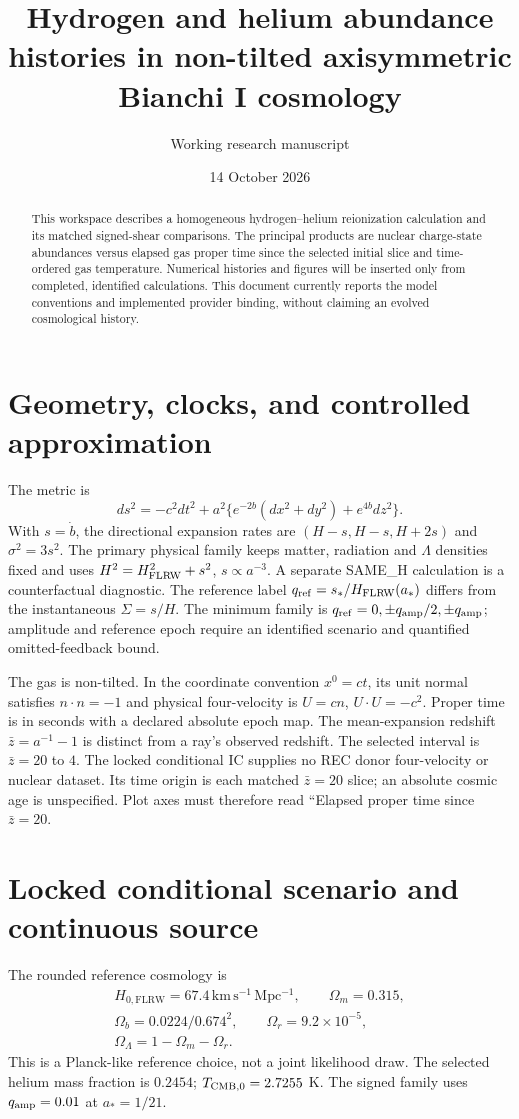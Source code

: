 \documentclass[11pt]{article}
\title{Hydrogen and helium abundance histories in non-tilted axisymmetric Bianchi I cosmology}
\author{Working research manuscript}
\date{14 October 2026}
\begin{document}
\maketitle
\begin{abstract}
This workspace describes a homogeneous hydrogen--helium reionization calculation and its matched signed-shear comparisons. The principal products are nuclear charge-state abundances versus elapsed gas proper time since the selected initial slice and time-ordered gas temperature. Numerical histories and figures will be inserted only from completed, identified calculations. This document currently reports the model conventions and implemented provider binding, without claiming an evolved cosmological history.
\end{abstract}
\section{Geometry, clocks, and controlled approximation}
The metric is
\begin{equation}
 ds^2=-c^2dt^2+a^2\{e^{-2b}(dx^2+dy^2)+e^{4b}dz^2\}.
\end{equation}
With $s=\dot b$, the directional expansion rates are $(H-s,H-s,H+2s)$ and $\sigma^2=3s^2$. The primary physical family keeps matter, radiation and $\Lambda$ densities fixed and uses $H^2=H_{\rm FLRW}^2+s^2$, $s\propto a^{-3}$. A separate SAME\_H calculation is a counterfactual diagnostic. The reference label $q_{\rm ref}=s_*/H_{\rm FLRW}(a_*)$ differs from the instantaneous $\Sigma=s/H$. The minimum family is $q_{\rm ref}=0,\pm q_{\rm amp}/2,\pm q_{\rm amp}$; amplitude and reference epoch require an identified scenario and quantified omitted-feedback bound.

The gas is non-tilted. In the coordinate convention $x^0=ct$, its unit normal satisfies $n\cdot n=-1$ and physical four-velocity is $U=cn$, $U\cdot U=-c^2$. Proper time is in seconds with a declared absolute epoch map. The mean-expansion redshift $\bar z=a^{-1}-1$ is distinct from a ray's observed redshift. The selected interval is $\bar z=20$ to $4$. The locked conditional IC supplies no REC donor four-velocity or nuclear dataset. Its time origin is each matched $\bar z=20$ slice; an absolute cosmic age is unspecified. Plot axes must therefore read ``Elapsed proper time since $\bar z=20$.


\section{Locked conditional scenario and continuous source}
The rounded reference cosmology is
\begin{gather*}
H_{0,\mathrm{FLRW}}=67.4\,\mathrm{km\,s^{-1}\,Mpc^{-1}},\qquad \Omega_m=0.315,\\
\Omega_b=0.0224/0.674^2,\qquad \Omega_r=9.2\times10^{-5},\\
\Omega_\Lambda=1-\Omega_m-\Omega_r.
\end{gather*}
 This is a Planck-like reference choice, not a joint likelihood draw. The selected helium mass fraction is $0.2454$; $T_{\rm CMB,0}=2.7255$ K. The signed family uses $q_{\rm amp}=0.01$ at $a_*=1/21$.
\end{document}
